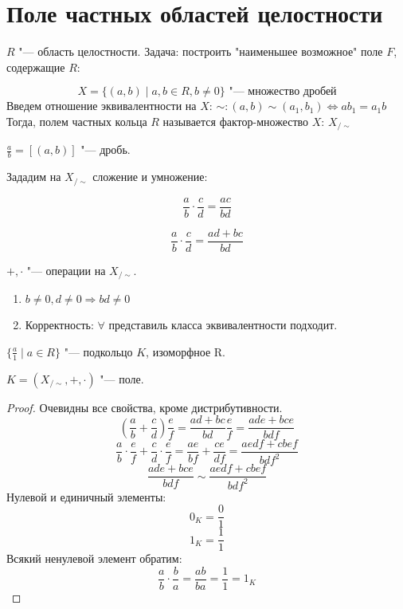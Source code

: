 ﻿\section{Поле частных областей целостности}
$R$ "--- область целостности.
Задача: построить "наименьшее возможное" поле $F$, содержащие $R$:
\begin{Def}
$$X = \{(a, b) \mid a, b \in R, b \neq 0 \} \text{ "--- множество дробей}$$
Введем отношение эквивалентности на $X$:
$\sim \colon (a, b) \sim (a_1, b_1) \Leftrightarrow ab_1 = a_1b$
Тогда, полем частных кольца $R$ называется фактор-множество $X$: $X_{/\sim}$
\end{Def}
\begin{Def}
$\frac{a}{b} = [(a, b)]$ "--- дробь.
\end{Def}
Зададим на $X_{/\sim}$ сложение и умножение:
\begin{Def}
$$\frac{a}{b} \cdot \frac{c}{d} = \frac{ac}{bd}$$
\end{Def}
\begin{Def}
$$\frac{a}{b} \cdot \frac{c}{d} = \frac{ad + bc}{bd}$$
\end{Def}
\begin{assertion}
$+, \cdot$ "--- операции на $X_{/\sim}$.
\begin{enumerate}
\item $b \neq 0, d \neq 0 \Rightarrow bd \neq 0$
\item Корректность: $\forall$ представиль класса эквивалентности подходит.
\end{enumerate}
\end{assertion}
\begin{assertion}
$\{\frac{a}{1} \mid a \in R \}$ "--- подкольцо $K$, изоморфное R.
\end{assertion}
\begin{theorem}
$K = (X_{/\sim}, +, \cdot)$ "--- поле.
\end{theorem}
\begin{proof}
Очевидны все свойства, кроме дистрибутивности.
$$\left(\frac{a}{b} + \frac{c}{d}\right) \frac{e}{f} = \frac{ad + bc}{bd} \frac{e}{f} = \frac{ade + bce}{bdf}$$
$$\frac{a}{b} \cdot \frac{e}{f} + \frac{c}{d} \cdot \frac{e}{f} = \frac{ae}{bf} + \frac{ce}{df} = \frac{aedf + cbef}{bdf^2}$$
$$\frac{ade + bce}{bdf} \sim \frac{aedf + cbef}{bdf^2}$$
Нулевой и единичный элементы:
$$0_K = \frac{0}{1}$$
$$1_K = \frac{1}{1}$$
Всякий ненулевой элемент обратим:
$$\frac{a}{b} \cdot \frac{b}{a} = \frac{ab}{ba} = \frac{1}{1} = 1_K$$
\end{proof}
